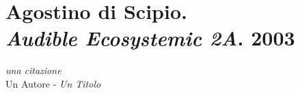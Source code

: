 
\chapter*{Agostino di Scipio.\\\emph{Audible Ecosystemic 2A}. 2003}

	\begin{flushright}
		\textit{una citazione} \\
		Un Autore - \emph{Un Titolo}
	\end{flushright}

\bigskip

\begin{multicols}{2}

\begin{quote}
	\lipsum[1-2]
\end{quote}

\lipsum[3-5]


\end{multicols}